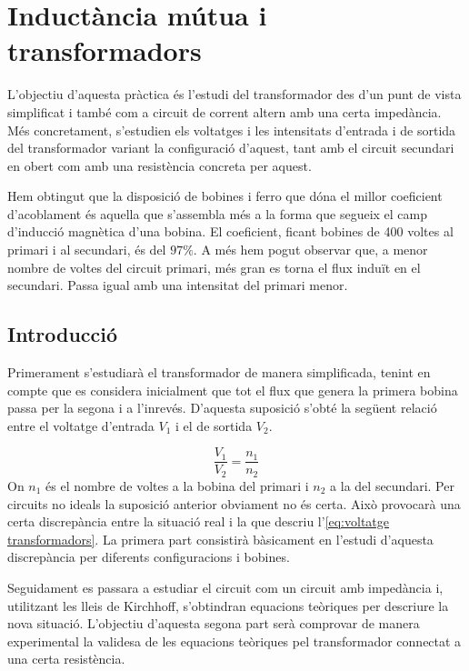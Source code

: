 \chapter{Inductància mútua i transformadors}

\begin{resum}
	L'objectiu d'aquesta pràctica és l'estudi del transformador des d'un punt de vista simplificat i també com a circuit de corrent altern amb una certa impedància. Més concretament, s'estudien els voltatges i les intensitats d'entrada i de sortida del transformador variant la configuració d'aquest, tant amb el circuit secundari en obert com amb una resistència concreta per aquest.
	
	Hem obtingut que la disposició de bobines i ferro que dóna el millor coeficient d'acoblament és aquella que s'assembla més a la forma que segueix el camp d'inducció magnètica d'una bobina. El coeficient, ficant bobines de 400 voltes al primari i al secundari, és del $97\%$. A més hem pogut observar que, a menor nombre de voltes del circuit primari, més gran es torna el flux induït en el secundari. Passa igual amb una intensitat del primari menor.
\end{resum}

\section{Introducció}\label{sec:introducció}

Primerament s'estudiarà el transformador de manera simplificada, tenint en compte que es considera inicialment que tot el flux que genera la primera bobina passa per la segona i a l'inrevés. D'aquesta suposició s'obté la següent relació entre el voltatge d'entrada $V_1$ i el de sortida $V_2$. 

\begin{equation}\label{eq:voltatge transformadors}
  \frac{V_1}{V_2}=\frac{n_1}{n_2}
\end{equation}
On $n_1$ és el nombre de voltes a la bobina del primari i $n_2$ a la del secundari. Per circuits no ideals la suposició anterior obviament no és certa. Això provocarà una certa discrepància entre la situació real i la que descriu l'\cref{eq:voltatge transformadors}. La primera part consistirà bàsicament en l'estudi d'aquesta discrepància per diferents configuracions i bobines.

Seguidament es passara a estudiar el circuit com un circuit amb impedància i, utilitzant les lleis de Kirchhoff, s'obtindran equacions teòriques per descriure la nova situació. L'objectiu d'aquesta segona part serà comprovar de manera experimental la validesa de les equacions teòriques pel transformador connectat a una certa resistència.

